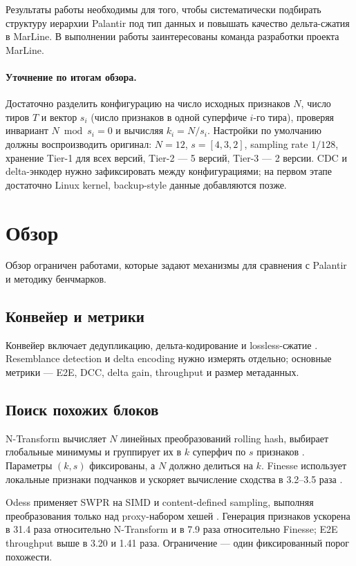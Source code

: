 \documentclass[a4paper]{article}
\begin{document}
Результаты работы необходимы для того, чтобы систематически подбирать структуру иерархии Palantir под тип данных и повышать качество дельта-сжатия в MarLine. В выполнении работы заинтересованы команда разработки проекта MarLine.

\paragraph{Уточнение по итогам обзора.} Достаточно разделить конфигурацию на число исходных признаков $N$, число тиров $T$ и вектор $s_i$ (число признаков в одной суперфиче $i$-го тира), проверяя инвариант $N \bmod s_i = 0$ и вычисляя $k_i = N/s_i$. Настройки по умолчанию должны воспроизводить оригинал: $N=12$, $s=[4,3,2]$, sampling rate $1/128$, хранение Tier-1 для всех версий, Tier-2 --- 5 версий, Tier-3 --- 2 версии. CDC и delta-энкодер нужно зафиксировать между конфигурациями; на первом этапе достаточно Linux kernel, backup-style данные добавляются позже.

\section{Обзор}

Обзор ограничен работами, которые задают механизмы для сравнения с Palantir и методику бенчмарков.

\subsection{Конвейер и метрики}

Конвейер включает дедупликацию, дельта-кодирование и lossless-сжатие \cite{palantir2024}. Resemblance detection и delta encoding нужно измерять отдельно; основные метрики --- E2E, DCC, delta gain, throughput и размер метаданных.

\subsection{Поиск похожих блоков}

N-Transform вычисляет $N$ линейных преобразований rolling hash, выбирает глобальные минимумы и группирует их в $k$ суперфич по $s$ признаков \cite{shilane2012}. Параметры $(k,s)$ фиксированы, а $N$ должно делиться на $k$. Finesse использует локальные признаки подчанков и ускоряет вычисление сходства в 3.2--3.5 раза \cite{finesse2019}.

Odess применяет SWPR на SIMD и content-defined sampling, выполняя преобразования только над proxy-набором хешей \cite{odess2023}. Генерация признаков ускорена в 31.4 раза относительно N-Transform и в 7.9 раза относительно Finesse; E2E throughput выше в 3.20 и 1.41 раза. Ограничение --- один фиксированный порог похожести.
\end{document}
